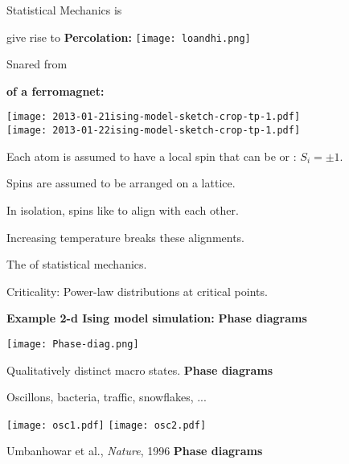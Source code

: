      
      Statistical Mechanics is 
    
       give rise to 
  \textbf{Percolation:}
    \texttt{[image: loandhi.png]}
    
    Snared from 
  \small

    \textbf{\normalsize {} of a ferromagnet:}
      \small
        
        \texttt{[image: 2013-01-21ising-model-sketch-crop-tp-1.pdf]}\\
        \texttt{[image: 2013-01-22ising-model-sketch-crop-tp-1.pdf]}
         
          Each atom is assumed to have a local spin 
          that can be  or : $ S_i = \pm 1$.
         
          Spins are assumed to be arranged on a lattice.
         
          In isolation, spins like to align with each other.
         
          Increasing temperature breaks these alignments.
         
          The  of statistical mechanics.
         
          Criticality: Power-law distributions at critical points.
      
    
    \textbf{Example 2-d Ising model simulation:}
      \small
  \textbf{Phase diagrams}

  \texttt{[image: Phase-diag.png]}

  \medskip

  Qualitatively distinct macro states.
  \textbf{Phase diagrams}

  Oscillons, bacteria, traffic, snowflakes, ...

  \medskip
  
  \texttt{[image: osc1.pdf]}
  \texttt{[image: osc2.pdf]}

  \medskip

  Umbanhowar et al., \textit{Nature}, 1996\cite{umbanhowar1996a}
  \textbf{Phase diagrams}

